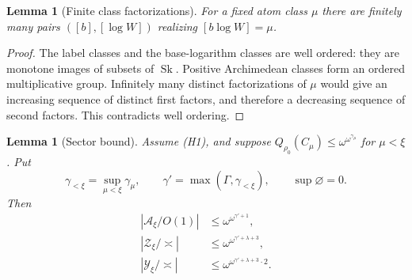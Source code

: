 \documentclass[11pt]{article}
\newtheorem{lemma}[theorem]{Lemma}
\theoremstyle{definition}
\theoremstyle{remark}
\newcommand{\Sk}{\operatorname{Sk}}
\newcommand{\arch}{\mathrel{\asymp}}
\newcommand{\Acal}{\mathcal A}
\newcommand{\Ycal}{\mathcal Y}
\newcommand{\Zcal}{\mathcal Z}
\numberwithin{equation}{section}
\begin{document}
\begin{lemma}[Finite class factorizations]\label{g-lem:factor}
For a fixed atom class $\mu$ there are finitely many pairs
$([b],[\log W])$ realizing $[b\log W]=\mu$.
\end{lemma}
\begin{proof}
The label classes and the base-logarithm classes are well ordered:
they are monotone images of subsets of $\Sk$.
Positive Archimedean classes form an ordered multiplicative group.
Infinitely many distinct factorizations of $\mu$ would give an
increasing sequence of distinct first factors, and therefore a
decreasing sequence of second factors.  This contradicts well ordering.
\end{proof}

\begin{lemma}[Sector bound]\label{g-lem:sector}
Assume (H1), and suppose
$Q_{\rho_0}(C_\mu)\le\omega^{\omega^{\gamma_\mu}}$ for $\mu<\xi$.
Put
\[
 \gamma_{<\xi}=\sup_{\mu<\xi}\gamma_\mu,\qquad
 \gamma'=\max(\Gamma,\gamma_{<\xi}),\qquad \sup\varnothing=0.
\]
Then
\[
 \begin{aligned}
 |\Acal_\xi/O(1)|&\le\omega^{\omega^{\gamma'+1}},\\
 |\Zcal_\xi/\arch|&\le\omega^{\omega^{\gamma'+\lambda+3}},\\
 |\Ycal_\xi/\arch|&\le
       \omega^{\omega^{\gamma'+\lambda+3}\cdot2}.
 \end{aligned}
\]
\end{lemma}
\end{document}
